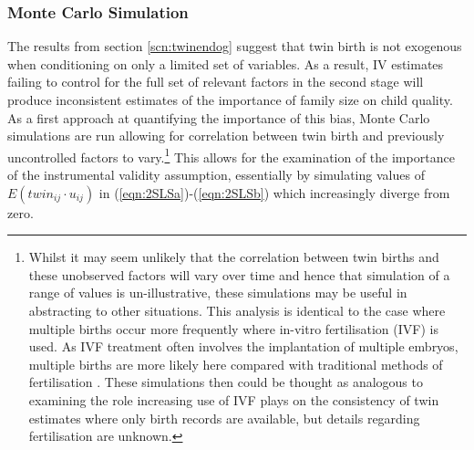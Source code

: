 \documentclass{article}[11pt,subeqn]
\begin{document}
\begin{spacing}{1.5}
\subsubsection{Monte Carlo Simulation}
\label{scn:MCS}
The results from section \ref{scn:twinendog} suggest that twin birth is not exogenous when conditioning on only a limited set of variables. As a result, 
IV estimates failing to control for the full set of 
relevant factors in the second stage will produce inconsistent estimates of the importance of family size on child quality.  As a first 
approach at quantifying the importance of this bias, Monte Carlo simulations are run allowing for correlation between twin birth and previously uncontrolled factors
to vary.\footnote{Whilst it may seem unlikely that the correlation between twin births and these unobserved factors will vary over time and hence that
simulation of a range of values is un-illustrative, these simulations may be useful in abstracting to other situations.  This analysis is identical to the
case where multiple births occur more frequently where in-vitro fertilisation (IVF) is used.  As IVF treatment often involves the implantation of 
multiple embryos, multiple births are more likely here compared with traditional methods of fertilisation \citep{Beraletal1990}.  These simulations then could be 
thought as analogous to examining the role increasing use of IVF plays on the consistency of twin estimates where only birth records are available, 
but details regarding fertilisation are unknown.}  This allows for the examination of the importance of the instrumental validity assumption, essentially
by simulating values of $E(twin_{ij}\cdot u_{ij})$ in (\ref{eqn:2SLSa})-(\ref{eqn:2SLSb}) which increasingly diverge from zero. 


\end{spacing}
\end{document}
